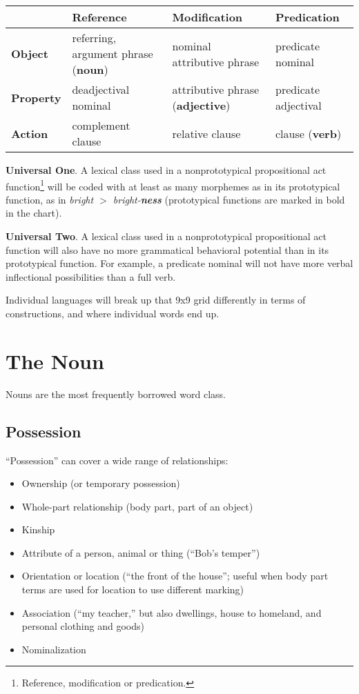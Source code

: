 \documentclass[11pt]{article}
\newcommand{\LL}[1]{\textbf{#1}}  %
\newenvironment{grammarlist}%
 {\begin{itemize}\addtolength{\itemsep}{-0.5\baselineskip}\ignorespaces}%
 {\end{itemize}\ignorespacesafterend}
\begin{document}
\begin{center}
  \small
  \begin{tabular}{|l|l|l|l|}
    \hline
    & \LL{Reference} & \LL{Modification} & \LL{Predication} \\
    \hline
\LL{Object} & referring, argument phrase (\LL{noun}) & nominal attributive phrase &
                                                                   predicate
                                                                   nominal \\
    \hline
\LL{Property} & deadjectival nominal & attributive phrase (\LL{adjective}) & predicate adjectival\\
    \hline
\LL{Action} & complement clause & relative clause & clause (\LL{verb})\\
    \hline
  \end{tabular}
\end{center}

\LL{Universal One}. A lexical class used in a nonprototypical
propositional act function\footnote{Reference, modification or
predication.} will be coded with at least as many morphemes as in
its prototypical function, as in \textit{bright $>$ bright-\LL{ness}}
(prototypical functions are marked in bold in the chart).

\LL{Universal Two}. A lexical class used in a nonprototypical
propositional act function will also have no more grammatical
behavioral potential than in its prototypical function. For example, a
predicate nominal will not have more verbal inflectional possibilities
than a full verb.

Individual languages will break up that 9x9 grid differently in terms
of constructions, and where individual words end up.


\section{The Noun}
Nouns are the most frequently borrowed word class.

\subsection{Possession}
``Possession'' can cover a wide range of relationships:

\begin{grammarlist}
  \item Ownership (or temporary possession)
  \item Whole-part relationship (body part, part of an object)
  \item Kinship
  \item Attribute of a person, animal or thing (``Bob's temper'')
  \item Orientation or location (``the front of the house''; useful
    when body part terms are used for location to use different
    marking)
  \item Association (``my teacher,'' but also dwellings, house to
    homeland, and personal clothing and goods)
  \item Nominalization
\end{grammarlist}
\end{document}
